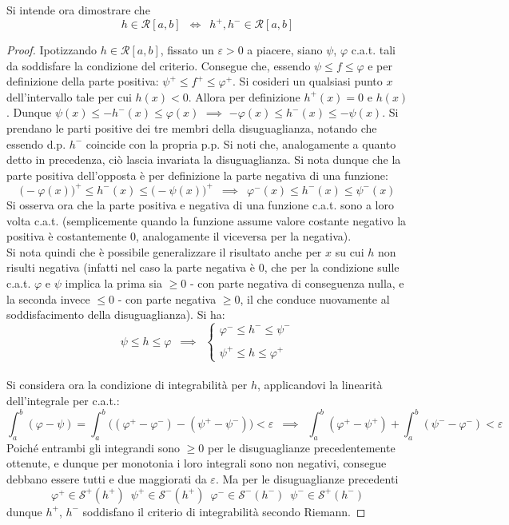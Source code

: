\documentclass[10pt, oneside]{book}
\theoremstyle{plain}
\begin{document}
Si intende ora dimostrare che
\[h \in \mathcal{R}[a,b] \enspace \Leftrightarrow \enspace h^+, h^- \in \mathcal{R}[a,b]\]
\begin{proof}
Ipotizzando $h \in \mathcal{R}[a,b]$, fissato un $\varepsilon > 0$ a piacere, siano $\psi$, $\varphi$ c.a.t. tali da soddisfare la condizione del criterio. Consegue che, essendo $\psi \leq f \leq \varphi$ e per definizione della parte positiva: $\psi^+ \leq f^+ \leq \varphi^+$. Si cosideri un qualsiasi punto $x$ dell'intervallo tale per cui $h(x) < 0$. Allora per definizione $h^+(x) = 0$ e $h(x)$. Dunque $\psi(x) \leq - h^-(x) \leq \varphi(x)$ $\implies$ $ - \varphi(x) \leq h^-(x) \leq - \psi(x)$. Si prendano le parti positive dei tre membri della disuguaglianza, notando che essendo d.p. $h^-$ coincide con la propria p.p. Si noti che, analogamente a quanto detto in precedenza, ciò lascia invariata la disuguaglianza. Si nota dunque che la parte positiva dell'opposta è per definizione la parte negativa di una funzione:
\[\big(-\varphi(x)\big)^+ \leq h^-(x) \leq \big(-\psi(x)\big)^+ \enspace \implies \enspace \varphi^-(x) \leq h^-(x) \leq \psi^-(x)\]
Si osserva ora che la parte positiva e negativa di una funzione c.a.t. sono a loro volta c.a.t. (semplicemente quando la funzione assume valore costante negativo la positiva è costantemente 0, analogamente il viceversa per la negativa). 
\\Si nota quindi che è possibile generalizzare il risultato anche per $x$ su cui $h$ non risulti negativa (infatti nel caso la parte negativa è $0$, che per la condizione sulle c.a.t. $\varphi$ e $\psi$ implica la prima sia $\geq 0$ - con parte negativa di conseguenza nulla, e la seconda invece $\leq 0$ - con parte negativa $\geq 0$, il che conduce nuovamente al soddisfacimento della disuguaglianza). Si ha:
\[\psi \leq h \leq \varphi \enspace \implies \enspace \begin{cases}
    \varphi^- \leq h^- \leq \psi^-\\
    \\
    \psi^+ \leq h \leq \varphi^+
\end{cases}\]
\\Si considera ora la condizione di integrabilità per $h$, applicandovi la linearità dell'integrale per c.a.t.:
\[\int_a^b (\varphi - \psi) = \int_a^b \big((\varphi^+ - \varphi^-) - (\psi^+ - \psi^-)\big) < \varepsilon \enspace \implies \enspace \int_a^b (\varphi^+ - \psi^+) + \int_a^b (\psi^- - \varphi^-) < \varepsilon\]
Poiché entrambi gli integrandi sono $\geq 0$ per le disuguaglianze precedentemente ottenute, e dunque per monotonia i loro integrali sono non negativi, consegue debbano essere tutti e due maggiorati da $\varepsilon$. Ma per le disuguaglianze precedenti
\[\varphi^+ \in  \mathcal{S}^+(h^+) \enspace \psi^+ \in  \mathcal{S}^-(h^+) \enspace \varphi^- \in  \mathcal{S}^-(h^-) \enspace \psi^- \in  \mathcal{S}^+(h^-)\]
dunque $h^+$, $h^-$ soddisfano il criterio di integrabilità secondo Riemann.
\end{proof}
\end{document}

